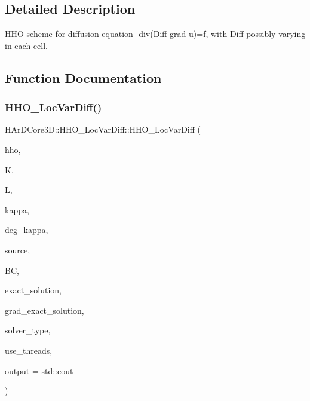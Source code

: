 \subsection{Detailed Description}
H\+HO scheme for diffusion equation -\/div(Diff grad u)=f, with Diff possibly varying in each cell. 



\subsection{Function Documentation}
\mbox{\label{group__HHO__LocVarDiff_ga6a6f808bf86dd5d3a757422b89df407b}} 
\subsubsection{\texorpdfstring{H\+H\+O\+\_\+\+Loc\+Var\+Diff()}{HHO\_LocVarDiff()}}
{\footnotesize\ttfamily H\+Ar\+D\+Core3\+D\+::\+H\+H\+O\+\_\+\+Loc\+Var\+Diff\+::\+H\+H\+O\+\_\+\+Loc\+Var\+Diff (\begin{DoxyParamCaption}\item[{\hyperlink{classHArDCore3D_1_1HybridCore}{Hybrid\+Core} \&}]{hho,  }\item[{size\+\_\+t}]{K,  }\item[{int}]{L,  }\item[{\hyperlink{classHArDCore3D_1_1HHO__LocVarDiff_a70a4ae64b7a421bf535c669f340b2641}{tensor\+\_\+function\+\_\+type}}]{kappa,  }\item[{size\+\_\+t}]{deg\+\_\+kappa,  }\item[{\hyperlink{classHArDCore3D_1_1HHO__LocVarDiff_ab56032fb1c52e4a24e75af0002d0a2d4}{source\+\_\+function\+\_\+type}}]{source,  }\item[{\hyperlink{classBoundaryConditions}{Boundary\+Conditions}}]{BC,  }\item[{\hyperlink{classHArDCore3D_1_1HHO__LocVarDiff_a7b0e23cbc8db30ca257c47df7fd4ca25}{solution\+\_\+function\+\_\+type}}]{exact\+\_\+solution,  }\item[{\hyperlink{classHArDCore3D_1_1HHO__LocVarDiff_aac4d74b1420ac542bcc2b96c11ccba55}{grad\+\_\+function\+\_\+type}}]{grad\+\_\+exact\+\_\+solution,  }\item[{std\+::string}]{solver\+\_\+type,  }\item[{bool}]{use\+\_\+threads,  }\item[{std\+::ostream \&}]{output = {\ttfamily std\+:\+:cout} }\end{DoxyParamCaption})}



